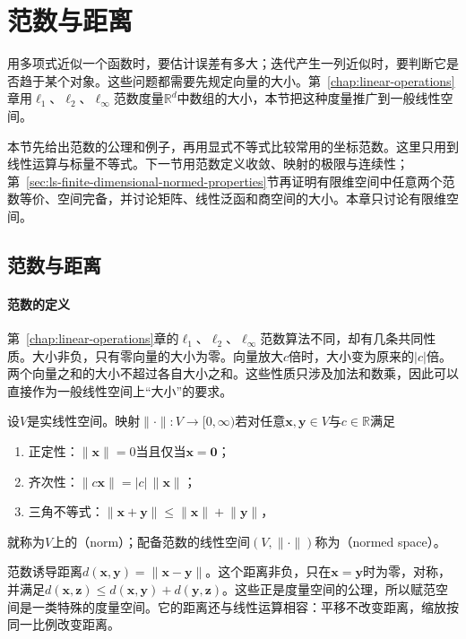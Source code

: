 
\section{范数与距离}
\label{sec:ls-normed-spaces}

用多项式近似一个函数时，要估计误差有多大；迭代产生一列近似时，要判断它是否趋于某个对象。这些问题都需要先规定向量的大小。第~\ref{chap:linear-operations}章用$\ell_1$、$\ell_2$、$\ell_\infty$范数度量$\mathbb R^d$中数组的大小，本节把这种度量推广到一般线性空间。

本节先给出范数的公理和例子，再用显式不等式比较常用的坐标范数。这里只用到线性运算与标量不等式。下一节用范数定义收敛、映射的极限与连续性；第~\ref{sec:ls-finite-dimensional-normed-properties}节再证明有限维空间中任意两个范数等价、空间完备，并讨论矩阵、线性泛函和商空间的大小。本章只讨论有限维空间。

\subsection{范数与距离}
\label{sec:ls-normed-space-definition}

\paragraph{范数的定义}
第~\ref{chap:linear-operations}章的$\ell_1$、$\ell_2$、$\ell_\infty$范数算法不同，却有几条共同性质。大小非负，只有零向量的大小为零。向量放大$c$倍时，大小变为原来的$|c|$倍。两个向量之和的大小不超过各自大小之和。这些性质只涉及加法和数乘，因此可以直接作为一般线性空间上“大小”的要求。
\begin{definition}[赋范空间]
\label{def:ls-normed-space}
\label{def:functional-normed-space}
设$V$是实线性空间。映射$\lVert\cdot\rVert:V\to[0,\infty)$若对任意$\bm x,\bm y\in V$与$c\in\mathbb R$满足
\begin{enumerate}
 \item 正定性：$\lVert\bm x\rVert=0$当且仅当$\bm x=\bm0$；
 \item 齐次性：$\lVert c\bm x\rVert=|c|\,\lVert\bm x\rVert$；
 \item 三角不等式：$\lVert\bm x+\bm y\rVert\leq\lVert\bm x\rVert+\lVert\bm y\rVert$，
\end{enumerate}
就称为$V$上的（norm）；配备范数的线性空间$(V,\lVert\cdot\rVert)$称为（normed space）。
\end{definition}
范数诱导距离$d(\bm x,\bm y)=\lVert\bm x-\bm y\rVert$。这个距离非负，只在$\bm x=\bm y$时为零，对称，并满足$d(\bm x,\bm z)\leq d(\bm x,\bm y)+d(\bm y,\bm z)$。这些正是度量空间的公理，所以赋范空间是一类特殊的度量空间。它的距离还与线性运算相容：平移不改变距离，缩放按同一比例改变距离。

